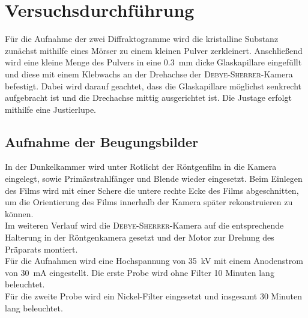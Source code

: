 \documentclass[a4paper,twoside,final]{article}
\begin{document}


\section{Versuchsdurchführung} \label{sec:Versuchsdurchführung}
Für die Aufnahme der zwei Diffraktogramme wird die kristalline Substanz zunächst mithilfe eines Mörser zu einem kleinen Pulver zerkleinert. Anschließend wird eine kleine Menge des Pulvers in eine \SI{0.3}{\milli\metre} dicke Glaskapillare eingefüllt und diese mit einem Klebwachs an der Drehachse der \textsc{Debye\--Sherrer}\--Kamera befestigt. Dabei wird darauf geachtet, dass die Glaskapillare möglichst senkrecht aufgebracht ist und die Drechachse mittig ausgerichtet ist. Die Justage erfolgt mithilfe eine Justierlupe.
\subsection{Aufnahme der Beugungsbilder}
In der Dunkelkammer wird unter Rotlicht der Röntgenfilm in die Kamera eingelegt, sowie Primärstrahlfänger und Blende wieder eingesetzt. Beim Einlegen des Films wird mit einer Schere die untere rechte Ecke des Films abgeschnitten, um die Orientierung des Films innerhalb der Kamera später rekonstruieren zu können.\\
Im weiteren Verlauf wird die \textsc{Debye\--Sherrer}\--Kamera auf die entsprechende Halterung in der Röntgenkamera gesetzt und der Motor zur Drehung des Präparats montiert.\\
Für die Aufnahmen wird eine Hochspannung von \SI{35}{\kilo\volt} mit einem Anodenstrom von \SI{30}{\milli\ampere} eingestellt. Die erste Probe wird ohne Filter 10 Minuten lang beleuchtet.\\
Für die zweite Probe wird ein Nickel-Filter eingesetzt und insgesamt 30 Minuten lang beleuchtet.
\end{document}
